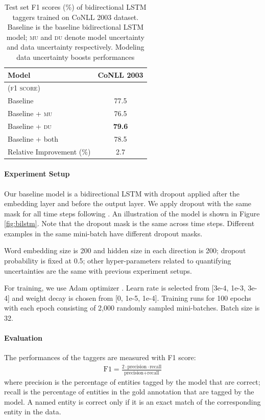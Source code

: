 \documentclass[letterpaper]{article} %
\begin{document}
\begin{table}[t!]
\begin{center}
\begin{tabular}{lc}
\hline
{\bf Model} & {\bf CoNLL 2003}\\  \hline
(\textsc{f1 score}) \\
Baseline & 77.5 \\
Baseline + \textsc{mu} & 76.5\\
Baseline + \textsc{du} & \bf 79.6 \\
Baseline + both        & 78.5 \\ \hline
Relative Improvement (\%) & 2.7 \\
\hline
\end{tabular}
\end{center}
\caption{\label{tab:ner_results}Test set F1 scores (\%) of bidirectional LSTM taggers trained on CoNLL 2003 dataset. Baseline is the baseline bidirectional LSTM model; \textsc{mu} and \textsc{du} denote model uncertainty and data uncertainty respectively. Modeling data uncertainty boosts performances}
\end{table}

\paragraph{Experiment Setup} Our baseline model is a bidirectional LSTM with dropout applied after the embedding layer and before the output layer. We apply dropout with the same mask for all time steps following \cite{gal2016theoretically}. An illustration of the model is shown in Figure \ref{fig:bilstm}. Note that the dropout mask is the same across time steps. Different examples in the same mini-batch have different dropout masks.

Word embedding size is 200 and hidden size in each direction is 200; dropout probability is fixed at 0.5; other hyper-parameters related to quantifying uncertainties are the same with previous experiment setups.

For training, we use Adam optimizer \cite{kingma2014adam}. Learn rate is selected from [3e-4, 1e-3, 3e-4] and weight decay is chosen from [0, 1e-5, 1e-4]. Training runs for 100 epochs with each epoch consisting of 2,000 randomly sampled mini-batches. Batch size is 32.

\paragraph{Evaluation}
The performances of the taggers are measured with F1 score:
\begin{align}
\text{F1}=\frac{2\cdot\text{precision}\cdot\text{recall}}{\text{precision}+\text{recall}}
\end{align}
where precision is the percentage of entities tagged by the model that are correct; recall is the percentage of entities in the gold annotation that are tagged by the model. A named entity is correct only if it is an exact match of the corresponding entity in the data.
\end{document}
